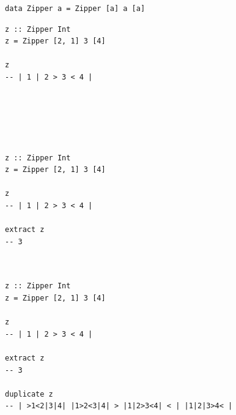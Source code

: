 \documentclass{beamer}
\begin{document}
\begin{frame}[fragile]
  \begin{verbatim}
data Zipper a = Zipper [a] a [a]
  \end{verbatim}
\end{frame}

\begin{frame}[fragile]
  \begin{overprint}
  \begin{verbatim}
z :: Zipper Int
z = Zipper [2, 1] 3 [4]

z
-- | 1 | 2 > 3 < 4 |






  \end{verbatim}
  \begin{verbatim}
z :: Zipper Int
z = Zipper [2, 1] 3 [4]

z
-- | 1 | 2 > 3 < 4 |

extract z
-- 3



  \end{verbatim}
  \begin{verbatim}
z :: Zipper Int
z = Zipper [2, 1] 3 [4]

z
-- | 1 | 2 > 3 < 4 |

extract z
-- 3

duplicate z
-- | >1<2|3|4| |1>2<3|4| > |1|2>3<4| < | |1|2|3>4< |
  \end{verbatim}
  \end{overprint}
\end{frame}
\end{document}

